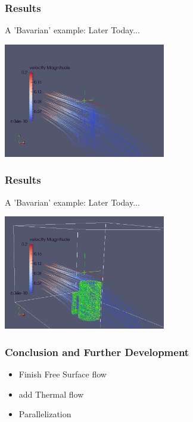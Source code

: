 \documentclass{beamer}
\begin{document}
\begin{frame}
\frametitle{Results}
A 'Bavarian' example: Later Today...
\begin{center}
\includegraphics[height=5cm]{beerflow3-withoutglass.png}
\end{center}
\end{frame}
\begin{frame}
\frametitle{Results}
A 'Bavarian' example: Later Today...
\begin{center}
\includegraphics[height=5cm]{beerflow2.png}
\end{center}
\end{frame}

\begin{frame}
\frametitle{Conclusion and Further Development}
\begin{itemize}
\item Finish Free Surface flow
\item add Thermal flow
\item Parallelization
\end{itemize}
\end{frame}
\end{document}
